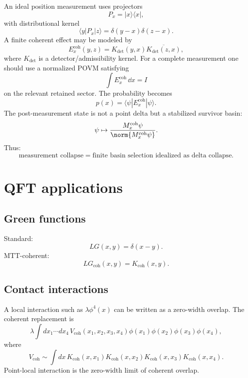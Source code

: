 \documentclass[11pt]{article}
\begin{document}
An ideal position measurement uses projectors
\begin{equation}
P_x=|x\rangle\langle x|,
\end{equation}
with distributional kernel
\begin{equation}
\langle y|P_x|z\rangle=\delta(y-x)\delta(z-x).
\end{equation}
A finite coherent effect may be modeled by
\begin{equation}
E_x^{\mathrm{coh}}(y,z)
=K_{\mathrm{det}}(y,x)\overline{K_{\mathrm{det}}(z,x)},
\end{equation}
where \(K_{\mathrm{det}}\) is a detector/admissibility kernel. For a complete measurement
one should use a normalized POVM satisfying
\begin{equation}
\int E_x^{\mathrm{coh}}\,\dd x=I
\end{equation}
on the relevant retained sector. The probability becomes
\begin{equation}
p(x)=\langle \psi|E_x^{\mathrm{coh}}|\psi\rangle.
\end{equation}
The post-measurement state is not a point delta but a stabilized survivor basin:
\begin{equation}
\psi\mapsto \frac{M_x^{\mathrm{coh}}\psi}{\norm{M_x^{\mathrm{coh}}\psi}}.
\end{equation}
Thus:
\[
\boxed{\text{measurement collapse}=\text{finite basin selection idealized as delta collapse}.}
\]

\section{QFT applications}

\subsection{Green functions}

Standard:
\begin{equation}
LG(x,y)=\delta(x-y).
\end{equation}
MTT-coherent:
\begin{equation}
LG_{\mathrm{coh}}(x,y)=K_{\mathrm{coh}}(x,y).
\end{equation}

\subsection{Contact interactions}

A local interaction such as \(\lambda\phi^4(x)\) can be written as a zero-width overlap.  The
coherent replacement is
\begin{equation}
\lambda\int dx_1\cdots dx_4\,
V_{\mathrm{coh}}(x_1,x_2,x_3,x_4)
\phi(x_1)\phi(x_2)\phi(x_3)\phi(x_4),
\end{equation}
where
\begin{equation}
V_{\mathrm{coh}}\sim
\int dx\,K_{\mathrm{coh}}(x,x_1)K_{\mathrm{coh}}(x,x_2)
K_{\mathrm{coh}}(x,x_3)K_{\mathrm{coh}}(x,x_4).
\end{equation}
Point-local interaction is the zero-width limit of coherent overlap.
\end{document}

